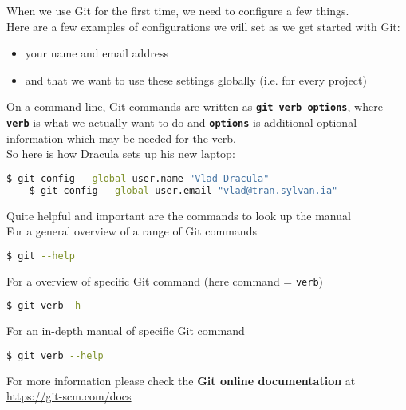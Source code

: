 \begin{frame}[fragile]
\emptyframetitle
  When we use Git for the first time, we need to configure a few things.\\[0.25cm]

  Here are a few examples of configurations we will set as we get started with Git:
  \begin{itemize}
    \item your name and email address
    \item and that we want to use these settings globally (i.e. for every project)
  \end{itemize}
  On a command line, Git commands are written as \texttt{\textbf{git verb options}}, where \texttt{\textbf{verb}} is what we actually want to do and \texttt{\textbf{options}} is additional optional information which may be needed for the verb.\\[0.25cm]

  So here is how Dracula sets up his new laptop:

  \begin{lstlisting}[language=bash]
    $ git config --global user.name "Vlad Dracula"
    $ git config --global user.email "vlad@tran.sylvan.ia"
  \end{lstlisting}

\end{frame}

\begin{frame}[fragile]
\emptyframetitle

  Quite helpful and important are the commands to look up the manual\\[0.25cm] 

  For a general overview of a range of Git commands
  \begin{lstlisting}[language=bash]
    $ git --help
  \end{lstlisting}

  For a overview of specific Git command (here command = \texttt{verb})
  \begin{lstlisting}[language=bash]
    $ git verb -h
  \end{lstlisting}

  For an in-depth manual of specific Git command
  \begin{lstlisting}[language=bash]
    $ git verb --help
  \end{lstlisting}

  \vspace*{0.5cm}
  For more information please check the \textbf{Git online documentation} at
  \url{https://git-scm.com/docs}

\end{frame}

